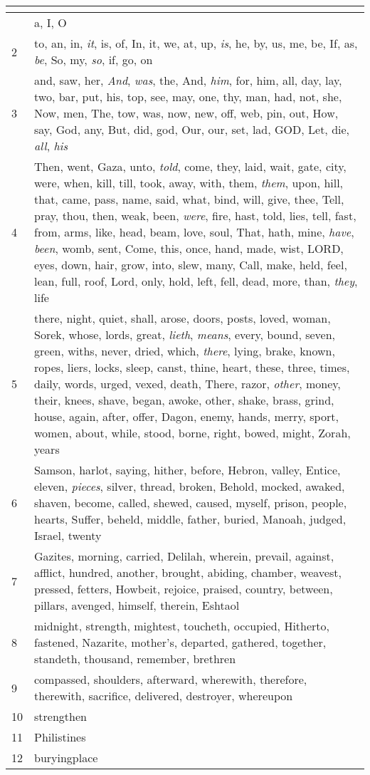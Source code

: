 \begin{center}
\begin{longtable}{l|p{3.75in}}
\hline \multicolumn{2}{c}{{ }} \\ \hline
\endfoot 
1 & a, I, O\\ \hline 
2 & to, an, in, \emph{it}, is, of, In, it, we, at, up, \emph{is}, he, by, us, me, be, If, as, \emph{be}, So, my, \emph{so}, if, go, on\\ \hline 
3 & and, saw, her, \emph{And}, \emph{was}, the, And, \emph{him}, for, him, all, day, lay, two, bar, put, his, top, see, may, one, thy, man, had, not, she, Now, men, The, tow, was, now, new, off, web, pin, out, How, say, God, any, But, did, god, Our, our, set, lad, GOD, Let, die, \emph{all}, \emph{his}\\ \hline 
4 & Then, went, Gaza, unto, \emph{told}, come, they, laid, wait, gate, city, were, when, kill, till, took, away, with, them, \emph{them}, upon, hill, that, came, pass, name, said, what, bind, will, give, thee, Tell, pray, thou, then, weak, been, \emph{were}, fire, hast, told, lies, tell, fast, from, arms, like, head, beam, love, soul, That, hath, mine, \emph{have}, \emph{been}, womb, sent, Come, this, once, hand, made, wist, LORD, eyes, down, hair, grow, into, slew, many, Call, make, held, feel, lean, full, roof, Lord, only, hold, left, fell, dead, more, than, \emph{they}, life\\ \hline 
5 & there, night, quiet, shall, arose, doors, posts, loved, woman, Sorek, whose, lords, great, \emph{lieth}, \emph{means}, every, bound, seven, green, withs, never, dried, which, \emph{there}, lying, brake, known, ropes, liers, locks, sleep, canst, thine, heart, these, three, times, daily, words, urged, vexed, death, There, razor, \emph{other}, money, their, knees, shave, began, awoke, other, shake, brass, grind, house, again, after, offer, Dagon, enemy, hands, merry, sport, women, about, while, stood, borne, right, bowed, might, Zorah, years\\ \hline 
6 & Samson, harlot, saying, hither, before, Hebron, valley, Entice, eleven, \emph{pieces}, silver, thread, broken, Behold, mocked, awaked, shaven, become, called, shewed, caused, myself, prison, people, hearts, Suffer, beheld, middle, father, buried, Manoah, judged, Israel, twenty\\ \hline 
7 & Gazites, morning, carried, Delilah, wherein, prevail, against, afflict, hundred, another, brought, abiding, chamber, weavest, pressed, fetters, Howbeit, rejoice, praised, country, between, pillars, avenged, himself, therein, Eshtaol\\ \hline 
8 & midnight, strength, mightest, toucheth, occupied, Hitherto, fastened, Nazarite, mother's, departed, gathered, together, standeth, thousand, remember, brethren\\ \hline 
9 & compassed, shoulders, afterward, wherewith, therefore, therewith, sacrifice, delivered, destroyer, whereupon\\ \hline 
10 & strengthen\\ \hline 
11 & Philistines\\ \hline 
12 & buryingplace\\ \hline 
\end{longtable}
\end{center}





